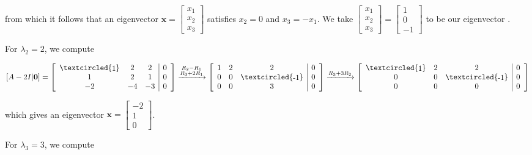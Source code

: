 \documentclass[
  letterpaper,
  DIV=11,
  numbers=noendperiod]{scrartcl}
\theoremstyle{remark}
\begin{document}
from which it follows that an eigenvector
\(\mathbf{x} = \left[\begin{array}{c} x_{1} \\ x_{2} \\ x_{3} \end{array}\right]\)
satisfies \(x_{2} = 0\) and \(x_{3} = -x_{1}\). We take
\(\left[\begin{array}{c} x_{1} \\ x_{2} \\ x_{3} \end{array}\right] = \left[\begin{array}{c} 1 \\ 0 \\ -1 \end{array}\right]\)
to be our eigenvector .

For \(\lambda _{2} = 2\), we compute

\(\left[A - 2I | \mathbf{0}\right] = \left[\begin{array}{ccc | c} \textcircled{\raisebox{-0.9pt}{1}} & 2 & 2 & 0 \\ 1 & 2 & 1 & 0 \\ -2 & -4 & -3 & 0 \end{array}\right] \xrightarrow{\begin{subarray}{c} R_{2} - R_{1} \\ R_{3} + 2R_{1} \end{subarray}} \left[\begin{array}{ccc | c} 1 & 2 & 2 & 0 \\ 0 & 0 & \textcircled{\raisebox{-0.9pt}{-1}} & 0 \\ 0 & 0 & 3 & 0 \end{array}\right] \xrightarrow{R_{3} + 3R_{2}} \left[\begin{array}{ccc | c} \textcircled{\raisebox{-0.9pt}{1}} & 2 & 2 & 0 \\ 0 & 0 & \textcircled{\raisebox{-0.9pt}{-1}} & 0 \\ 0 & 0 & 0 & 0 \end{array}\right]\)

which gives an eigenvector
\(\mathbf{x} = \left[\begin{array}{c} -2 \\ 1 \\ 0 \end{array}\right]\).

For \(\lambda _{3} = 3\), we compute
\end{document}
